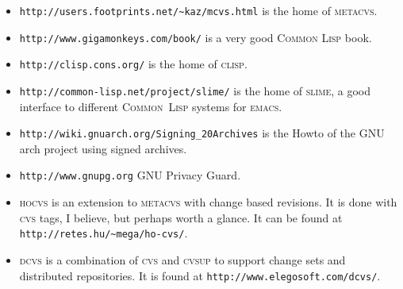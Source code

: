 \documentclass[fleqn, 10pt, a4paper]{report}
\begin{document}
\begin{itemize}
\item \texttt{http://users.footprints.net/\textasciitilde{}kaz/mcvs.html} is the home of
\textsc{metacvs}.
\item \texttt{http://www.gigamonkeys.com/book/} is a very good
\textsc{Common Lisp} book.
\item \texttt{http://clisp.cons.org/} is the home of \textsc{clisp}.
\item \texttt{http://common-lisp.net/project/slime/} is the home of
\textsc{slime}, a good interface to different \textsc{Common~Lisp}
systems for \textsc{emacs}.
\item \texttt{http://wiki.gnuarch.org/Signing\_20Archives} is the Howto of the
GNU arch project using signed archives.
\item \texttt{http://www.gnupg.org} GNU Privacy Guard.
\item \textsc{hocvs} is an extension to \textsc{metacvs} with change based
revisions. It is done with \textsc{cvs} tags, I believe, but perhaps worth a
glance. It can be found at \texttt{http://retes.hu/\textasciitilde{}mega/ho-cvs/}.
\item \textsc{dcvs} is a combination of \textsc{cvs} and \textsc{cvsup}
to support change sets and distributed repositories. It is found
at \texttt{http://www.elegosoft.com/dcvs/}.
\end{itemize}
\end{document}
